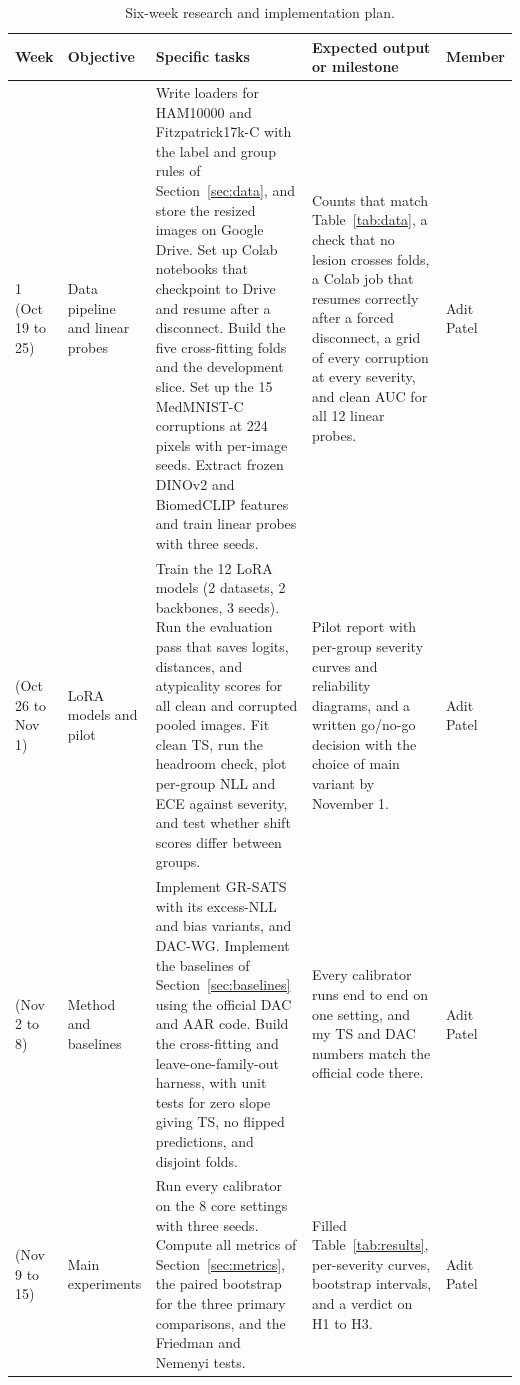 \documentclass[sigconf,nonacm]{acmart}
\begin{document}
\begin{table}[t]
  \caption{Six-week research and implementation plan.}
  \label{tab:plan}
  \scriptsize
  \setlength{\tabcolsep}{4pt}
  \renewcommand{\arraystretch}{1.15}
  \begin{tabularx}{\textwidth}{@{}P{1.3cm}P{2.1cm}LP{4.6cm}P{1.15cm}@{}}
    \toprule
    \textbf{Week} & \textbf{Objective} & \textbf{Specific tasks} & \textbf{Expected output or milestone} & \textbf{Member} \\
     (Oct 19 to 25) & Data pipeline and linear probes & Write loaders for HAM10000 and Fitzpatrick17k-C with the label and group rules of Section~\ref{sec:data}, and store the resized images on Google Drive. Set up Colab notebooks that checkpoint to Drive and resume after a disconnect. Build the five cross-fitting folds and the development slice. Set up the 15 MedMNIST-C corruptions at 224 pixels with per-image seeds. Extract frozen DINOv2 and BiomedCLIP features and train linear probes with three seeds. & Counts that match Table~\ref{tab:data}, a check that no lesion crosses folds, a Colab job that resumes correctly after a forced disconnect, a grid of every corruption at every severity, and clean AUC for all 12 linear probes. & Adit Patel \\
     (Oct 26 to Nov 1) & LoRA models and pilot & Train the 12 LoRA models (2 datasets, 2 backbones, 3 seeds). Run the evaluation pass that saves logits, distances, and atypicality scores for all clean and corrupted pooled images. Fit clean TS, run the headroom check, plot per-group NLL and ECE against severity, and test whether shift scores differ between groups. & Pilot report with per-group severity curves and reliability diagrams, and a written go/no-go decision with the choice of main variant by November 1. & Adit Patel \\
     (Nov 2 to 8) & Method and baselines & Implement GR-SATS with its excess-NLL and bias variants, and DAC-WG. Implement the baselines of Section~\ref{sec:baselines} using the official DAC and AAR code. Build the cross-fitting and leave-one-family-out harness, with unit tests for zero slope giving TS, no flipped predictions, and disjoint folds. & Every calibrator runs end to end on one setting, and my TS and DAC numbers match the official code there. & Adit Patel \\
     (Nov 9 to 15) & Main experiments & Run every calibrator on the 8 core settings with three seeds. Compute all metrics of Section~\ref{sec:metrics}, the paired bootstrap for the three primary comparisons, and the Friedman and Nemenyi tests. & Filled Table~\ref{tab:results}, per-severity curves, bootstrap intervals, and a verdict on H1 to H3. & Adit Patel \\

\end{tabularx}
\end{table}
\end{document}
